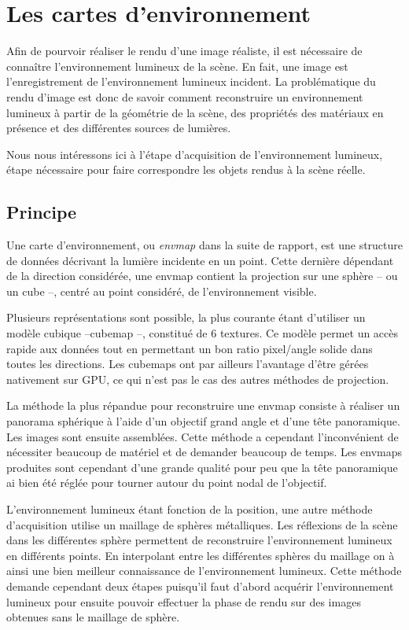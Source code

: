 \documentclass[10pt,a4paper,twoside, twocolumn]{report}
\begin{document}
\iftwocolumn \twocolumn \else \onecolumn \fi


\chapter{Les cartes d’environnement}


Afin de pourvoir réaliser le rendu d’une image réaliste, il est nécessaire de connaître l’environnement lumineux de la scène. En fait, une image est l’enregistrement de l’environnement lumineux incident. La problématique du rendu d’image est donc de savoir comment reconstruire un environnement lumineux à partir de la géométrie de la scène, des propriétés des matériaux en présence et des différentes sources de lumières.

Nous nous intéressons ici à l’étape d’acquisition de l’environnement lumineux, étape nécessaire pour faire correspondre les objets rendus à la scène réelle.


\section{Principe}

Une carte d’environnement, ou \emph{envmap} dans la suite de rapport, est une structure de données décrivant la lumière incidente en un point. Cette dernière dépendant de la direction considérée, une envmap contient la projection sur une sphère -- ou un cube --, centré au point considéré, de l’environnement visible.

Plusieurs représentations sont possible, la plus courante étant d'utiliser un modèle cubique --cubemap --, constitué de $6$ textures. Ce modèle permet un accès rapide aux données tout en permettant un bon ratio pixel/angle solide dans toutes les directions. Les cubemaps ont par ailleurs l'avantage d’être gérées nativement sur GPU, ce qui n'est pas le cas des autres méthodes de projection.

La méthode la plus répandue pour reconstruire une envmap consiste à réaliser un panorama sphérique à l’aide d’un objectif grand angle et d’une tête panoramique. Les images sont ensuite assemblées. Cette méthode a cependant l’inconvénient de nécessiter beaucoup de matériel et de demander beaucoup de temps. Les envmaps produites sont cependant d’une grande qualité pour peu que la tête panoramique ai bien été réglée pour tourner autour du point nodal de l’objectif.

L’environnement lumineux étant fonction de la position, une autre méthode d’acquisition utilise un maillage de sphères métalliques. Les réflexions de la scène dans les différentes sphère permettent de reconstruire l’environnement lumineux en différents points. En interpolant entre les différentes sphères du maillage on à ainsi une bien meilleur connaissance de l’environnement lumineux. Cette méthode demande cependant deux étapes puisqu’il faut d’abord acquérir l’environnement lumineux pour ensuite pouvoir effectuer la phase de rendu sur des images obtenues sans le maillage de sphère.
\end{document}
